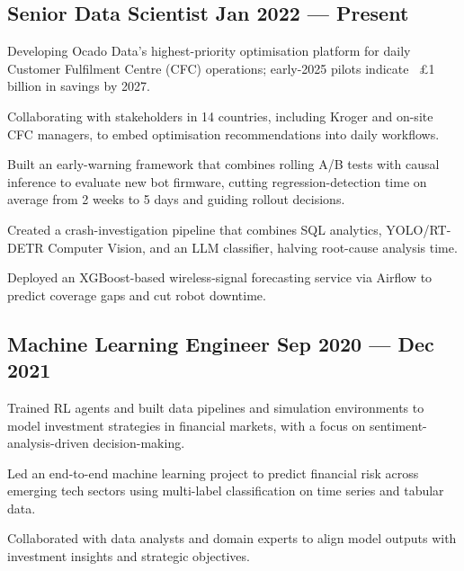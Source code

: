 \subsection{{Senior Data Scientist \hfill Jan 2022 --- Present}}
\begin{zitemize}
\item Developing Ocado Data’s highest-priority optimisation platform for daily Customer Fulfilment Centre (CFC) operations; early-2025 pilots indicate ~£1 billion in savings by 2027. 
\item Collaborating with stakeholders in 14 countries, including Kroger and on-site CFC managers, to embed optimisation recommendations into daily workflows.  
\item Built an early-warning framework that combines rolling A/B tests with causal inference to evaluate new bot firmware, cutting regression-detection time on average from 2 weeks to 5 days and guiding rollout decisions.  
\item Created a crash-investigation pipeline that combines SQL analytics, YOLO/RT-DETR Computer Vision, and an LLM classifier, halving root-cause analysis time.  
\item Deployed an XGBoost-based wireless-signal forecasting service via Airflow to predict coverage gaps and cut robot downtime.  
\end{zitemize}
\subsection{{Machine Learning Engineer \hfill Sep 2020 --- Dec 2021}}
\begin{zitemize}
\item Trained RL agents and built data pipelines and simulation environments to model investment strategies in financial markets, with a focus on sentiment-analysis-driven decision-making.  
\item Led an end-to-end machine learning project to predict financial risk across emerging tech sectors using multi-label classification on time series and tabular data.  
\item Collaborated with data analysts and domain experts to align model outputs with investment insights and strategic objectives.  
\end{zitemize}
